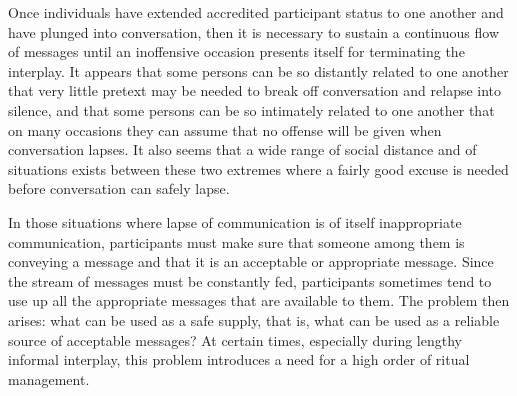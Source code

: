 \documentclass[twoside,symmetric,nobib,justified]{tufte-book}
\begin{document}
Once individuals have extended accredited participant status to one
another and have plunged into conversation, then it is necessary to
sustain a continuous flow of messages until an inoffensive occasion
presents itself for terminating the interplay. It appears that some
persons can be so distantly related to one another that very little
pretext may be needed to break off conversation and relapse into
silence, and that some persons can be so intimately related to one
another that on many occasions they can assume that no offense will be
given when conversation lapses. It also seems that a wide range of
social distance and of situations exists between these two extremes
where a fairly good excuse is needed before conversation can safely
lapse.

In those situations where lapse of communication is of itself
inappropriate communication, participants must make sure that someone
among them is conveying a message and that it is an acceptable or
appropriate message. Since the stream of messages must be constantly
fed, participants sometimes tend to use up all the appropriate messages
that are available to them. The problem then arises: what can be used as
a safe supply, that is, what can be used as a reliable source of
acceptable messages? At certain times, especially during lengthy
informal interplay, this problem introduces a need for a high order of
ritual management.
\end{document}
